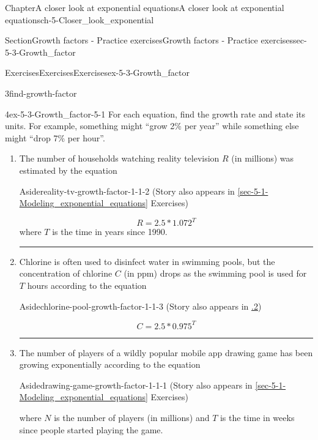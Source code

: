 \documentclass[twoside,11pt,]{book}
\newcommand{\xreffont}{\relax}
\newlength{\workspacestrutwidth}
\numberwithin{equation}{section}
\begin{document}
\begin{chapterptx}{Chapter}{A closer look at exponential equations}{}{A closer look at exponential equations}{}{}{ch-5-Closer_look_exponential}
\begin{sectionptx}{Section}{Growth factors - Practice exercises}{}{Growth factors - Practice exercises}{}{}{sec-5-3-Growth_factor}
\begin{exercises-subsection-numberless}{Exercises}{Exercises}{}{Exercises}{}{}{ex-5-3-Growth_factor}
\begin{divisionexercise}{3}{}{}{find-growth-factor}
\begin{enumerate}[label=(\alph*),ref=\alph*]
\end{enumerate}%
\end{divisionexercise}%
\clearpage
\begin{divisionexercise}{4}{}{}{ex-5-3-Growth_factor-5-1}%
For each equation, find the growth rate and state its units. For example, something might ``grow 2\% per year'' while something else might ``drop 7\% per hour''.%
\begin{enumerate}[label=(\alph*),ref=\alph*]%
\item\label{reality-tv-growth-factor}The number of households watching reality television \(R\) (in millions) was estimated by the equation \begin{aside}{Aside}{}{reality-tv-growth-factor-1-1-2}%
(Story also appears in \hyperref[sec-5-1-Modeling_exponential_equations]{{\xreffont\ref{sec-5-1-Modeling_exponential_equations}}} Exercises)%
\end{aside}
%
\begin{equation*}
R=2.5 \ast 1.072^T
\end{equation*}
where \(T\) is the time in years since 1990.%
\par\rule{\workspacestrutwidth}{1.5in}%
\item\label{chlorine-pool-growth-factor}Chlorine is often used to disinfect water in swimming pools, but the concentration of chlorine \(C\) (in ppm) drops as the swimming pool is used for \(T\) hours according to the equation \begin{aside}{Aside}{}{chlorine-pool-growth-factor-1-1-3}%
(Story also appears in \hyperlink{chlorine-pool-solving-exponential}{{\xreffont 3.4.2}})%
\end{aside}
%
\begin{equation*}
C = 2.5 \ast 0.975^T
\end{equation*}
%
\par\rule{\workspacestrutwidth}{1.5in}%
\item\label{drawing-game-growth-factor}The number of players of a wildly popular mobile app drawing game has been growing exponentially according to the equation \begin{aside}{Aside}{}{drawing-game-growth-factor-1-1-1}%
(Story also appears in \hyperref[sec-5-1-Modeling_exponential_equations]{{\xreffont\ref{sec-5-1-Modeling_exponential_equations}}} Exercises)%
\end{aside}
 where \(N\) is the number of players (in millions) and \(T\) is the time in weeks since people started playing the game.%
\begin{equation*}

\end{equation*}
\end{enumerate}
\end{divisionexercise}
\end{exercises-subsection-numberless}
\end{sectionptx}
\end{chapterptx}
\end{document}
